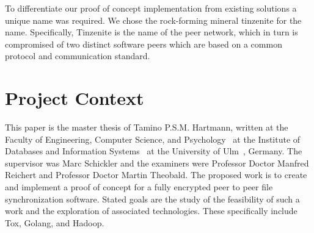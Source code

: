 To differentiate our proof of concept implementation from existing solutions a unique name was required.
We chose the rock-forming mineral tinzenite for the name.
Specifically, Tinzenite is the name of the peer network, which in turn is compromised of two distinct software peers which are based on a common protocol and communication standard.

\section{Project Context}

This paper is the master thesis of Tamino P.S.M. Hartmann, written at the Faculty of Engineering, Computer Science, and Psychology~\cite{web:site:faculty} at the Institute of Databases and Information Systems~\cite{web:site:institute} at the University of Ulm~\cite{web:site:uni_ulm}, Germany.
The supervisor was Marc Schickler and the examiners were Professor Doctor Manfred Reichert and Professor Doctor Martin Theobald.
The proposed work is to create and implement a proof of concept for a fully encrypted peer to peer file synchronization software.
Stated goals are the study of the feasibility of such a work and the exploration of associated technologies.
These specifically include Tox, Golang, and Hadoop.
